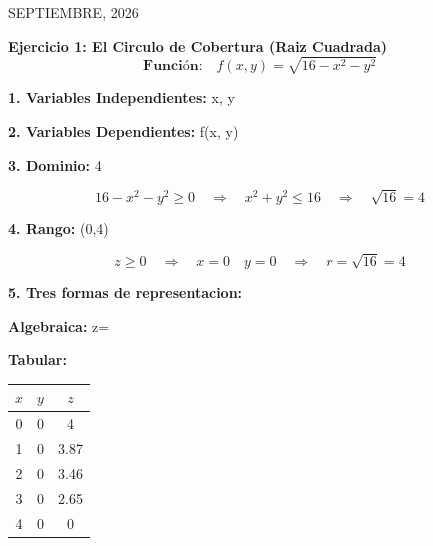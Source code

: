 \documentclass[12pt]{article}
\begin{document}
\vfill
\begin{flushright}
{\small SEPTIEMBRE, 2026}
\end{flushright}

\newpage

\begin{justify}
    
{\Large \textbf{Ejercicio 1: El Circulo de Cobertura (Raiz Cuadrada)}}
\vspace{0.1cm}
\[\textbf{Función:}\quad f(x,y)=\sqrt{16-x^2-y^2}\]

\begin{justify}
{\textbf{1. Variables Independientes:}} {\small x, y}
\vspace{0.01cm}
\end{justify}

\begin{justify}
{\textbf{2. Variables Dependientes:}} {\small f(x, y)}
\vspace{0.01cm}
\end{justify}

\begin{justify}
{\textbf{3. Dominio:}} {\small 4}
\vspace{0.01cm}
\end{justify}

\begin{center}
\[16-x^2-y^2 \geq 0 \quad \Longrightarrow \quad x^2+y^2 \leq 16 \quad \Longrightarrow \quad \sqrt{16}=4\]
\end{center}

\begin{justify}
{\textbf{4. Rango:}} {\small (0,4)}
\vspace{0.01cm}
\end{justify}

\begin{center}
\[z \geq 0 \quad \Longrightarrow \quad x=0 \quad y=0 \quad \Longrightarrow \quad r=\sqrt{16}=4\]
\end{center}

\begin{justify}
   {\textbf{5. Tres formas de representacion:}}
   \vspace{0.01cm}
\end{justify}

\begin{justify}
    \small\textbf {Algebraica: } \small
z=
\end{justify}

\begin{justify}
\small\textbf {Tabular: }
\begin{tabular}{|c|c|c|}
\hline
\textbf{$x$} & \textbf{$y$} & \textbf{$z$} \\ \hline
0 & 0 & 4 \\ \hline
1 & 0 & 3.87 \\ \hline
2 & 0 & 3.46 \\ \hline
3 & 0 & 2.65 \\ \hline
4 & 0 & 0 \\ \hline
\end{tabular}
\end{justify}


\end{justify}
\end{document}
